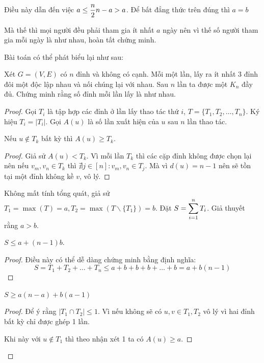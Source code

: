 \documentclass[11pt]{scrartcl}
\begin{document}
\begin{itemize}[label=, leftmargin=0em, itemsep=0.5em]
\begin{sol}
        Điều này dẫn đến việc $a \leq \frac{n}{2} \lra n - a > a$. Để bất đẳng thức trên đúng thì $a = b$



        Mà thế thì mọi người đều phải tham gia ít nhất $a$ ngày nên vì thế số người tham gia mỗi ngày là như nhau, hoàn tất chứng minh.

    \end{sol}
    
     Bài toán có thể phát biểu lại như sau:
    \begin{lemma}
        Xét $G = (V,E)$ có $n$ đỉnh và không có cạnh. Mỗi một lần, lấy ra ít nhất 3 đỉnh đôi một độc lập nhau và nối chúng lại với nhau. Sau $n$ lần ta được một $K_n$ đầy đủ. Chứng minh rằng số đỉnh mỗi lần lấy là như nhau.
    \end{lemma}
    \begin{proof}
        
        Gọi $T_i$ là tập hợp các đỉnh ở lần lấy thao tác thứ $i$, $T = \{T_1,T_2,\dots,T_n\}$. Ký hiệu $T_i = |T_i|$. Gọi $A(u)$ là số lần xuất hiện của $u$ sau $n$ lần thao tác. 

         Nếu $u \notin T_k$ bất kỳ thì $A(u) \geq T_k$.
        \begin{proof}
            Giả sử $A(u) < T_k$. Vì mỗi lần $T_k$ thì các cặp đỉnh không được chọn lại nên nếu $v_m,v_n \in T_k$ thì $\nexists j \in [n]: v_m,v_n \in T_j$. Mà vì $d(u) = n - 1$ nên sẽ tồn tại một đỉnh không kề $v$, vô lý.
        \end{proof}
        Không mất tính tổng quát, giả sử $T_1 = \max(T) = a, T_2 = \max(T \backslash \{T_1\}) = b$. Đặt $S = \displaystyle\sum_{i = 1}^n T_i$. Giả thuyết rằng $a > b$.

         $S \leq a +(n - 1)b$. 
        \begin{proof}
            Điều này có thể dễ dàng chứng minh bằng định nghĩa:
            \[
                S = T_1 + T_2 + \dots + T_n  \leq a + b + b + b +\dots + b = a + b(n - 1)
            \]
        \end{proof}
          $S \geq a(n - a) + b(a - 1)$
        \begin{proof}
            Để ý rằng $|T_1 \cap T_2| \leq 1$. Vì nếu không sẽ có $u,v \in T_1,T_2$ vô lý vì hai đỉnh bất kỳ chỉ được ghép 1 lần. 
            
            Khi này với $u  \notin T_1$ thì theo nhận xét 1 ta có $A(u) \geq a$. 
            

\end{proof}
\end{proof}
\end{itemize}
\end{document}
